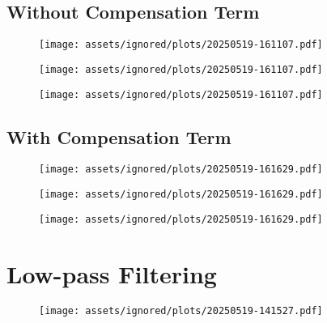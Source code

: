 \subsection{Without Compensation Term}

\begin{figure}[!ht]
    \centering
    \texttt{[image: assets/ignored/plots/20250519-161107.pdf]}
    \label{fig:results:tpc:bend:1:pos}
    \caption{}
\end{figure}

\begin{figure}[!ht]
    \centering
    \texttt{[image: assets/ignored/plots/20250519-161107.pdf]}
    \label{fig:results:tpc:bend:1:pos}
    \caption{}
\end{figure}

\begin{figure}[!ht]
    \centering
    \texttt{[image: assets/ignored/plots/20250519-161107.pdf]}
    \label{fig:results:tpc:bend:1:pos}
    \caption{}
\end{figure}



\FloatBarrier


\subsection{With Compensation Term}

\begin{figure}[!ht]
    \centering
    \texttt{[image: assets/ignored/plots/20250519-161629.pdf]}
    \label{fig:results:tpc:bend:1:pos}
    \caption{}
\end{figure}

\begin{figure}[!ht]
    \centering
    \texttt{[image: assets/ignored/plots/20250519-161629.pdf]}
    \label{fig:results:tpc:bend:1:pos}
    \caption{}
\end{figure}

\begin{figure}[!ht]
    \centering
    \texttt{[image: assets/ignored/plots/20250519-161629.pdf]}
    \label{fig:results:tpc:bend:1:pos}
    \caption{}
\end{figure}

\FloatBarrier


\section{Low-pass Filtering}
\begin{figure}[h!]
    \centering
    \texttt{[image: assets/ignored/plots/20250519-141527.pdf]}
    \label{fig:results:tpc:stretch:1:task:3}
    \caption{}
\end{figure}


\label{sec:results:lowpass_filtering}
